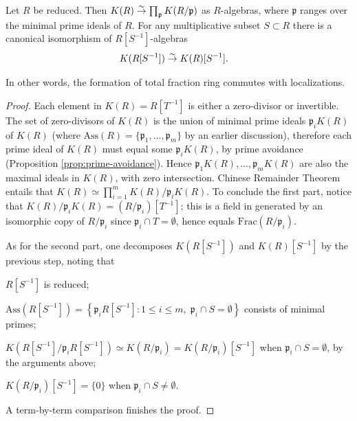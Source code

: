 \begin{lemma}\label{prop:K-vs-localization}
	Let $R$ be reduced. Then $K(R) \stackrel{\sim}{\rightarrow} \prod_{\mathfrak{p}} K(R/\mathfrak{p})$ as $R$-algebras, where $\mathfrak{p}$ ranges over the minimal prime ideals of $R$. For any multiplicative subset $S \subset R$ there is a canonical isomorphism of $R[S^{-1}]$-algebras
	\begin{align*}
	K(R[S^{-1}]) & \stackrel{\sim}{\rightarrow} K(R)[S^{-1}].
	\end{align*}
\end{lemma}
In other words, the formation of total fraction ring commutes with localizations.
\begin{proof}
	Each element in $K(R) = R[T^{-1}]$ is either a zero-divisor or invertible. The set of zero-divisors of $K(R)$ is the union of minimal prime ideals $\mathfrak{p}_i K(R)$ of $K(R)$ (where $\text{Ass}(R) = \{ \mathfrak{p}_1, \ldots, \mathfrak{p}_m\}$ by an earlier discussion), therefore each prime ideal of $K(R)$ must equal some $\mathfrak{p}_i K(R)$, by prime avoidance (Proposition \ref{prop:prime-avoidance}). Hence $\mathfrak{p}_1 K(R), \ldots, \mathfrak{p}_m K(R)$ are also the maximal ideals in $K(R)$, with zero intersection. Chinese Remainder Theorem entails that $K(R) \simeq \prod_{i=1}^m K(R)/\mathfrak{p}_i K(R)$. To conclude the first part, notice that $K(R)/\mathfrak{p}_i K(R) = (R/\mathfrak{p}_i)[T^{-1}]$; this is a field in generated by an isomorphic copy of $R/\mathfrak{p}_i$ since $\mathfrak{p}_i \cap T = \emptyset$, hence equals $\text{Frac}(R/\mathfrak{p}_i)$.
	
	As for the second part, one decomposes $K(R[S^{-1}])$ and $K(R)[S^{-1}]$ by the previous step, noting that
	\begin{compactitem}
		\item $R[S^{-1}]$ is reduced;
		\item $\text{Ass}(R[S^{-1}]) = \left\{ \mathfrak{p}_i R[S^{-1}]: 1 \leq i \leq m, \; \mathfrak{p}_i \cap S = \emptyset \right\}$ consists of minimal primes;
		\item $K\left( R[S^{-1}] \big/ \mathfrak{p}_i R[S^{-1}]\right) \simeq K(R/\mathfrak{p}_i) = K(R/\mathfrak{p}_i)[S^{-1}]$ when $\mathfrak{p}_i \cap S = \emptyset$, by the arguments above;
		\item $K(R/\mathfrak{p}_i)[S^{-1}] = \{0\}$ when $\mathfrak{p}_i \cap S \neq \emptyset$.
	\end{compactitem}
	A term-by-term comparison finishes the proof.
\end{proof}

